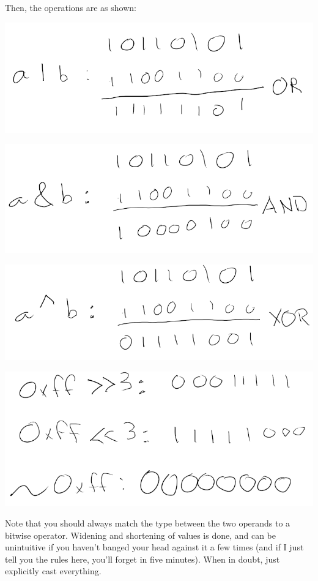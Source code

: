 \documentclass[11pt]{article}
\begin{document}
Then, the operations are as shown:

\begin{center}
\includegraphics[width=.9\linewidth]{./imgs/abor.png}
\end{center}
\begin{center}
\includegraphics[width=.9\linewidth]{./imgs/aband.png}
\end{center}
\begin{center}
\includegraphics[width=.9\linewidth]{./imgs/abxor.png}
\end{center}
\begin{center}
\includegraphics[width=.9\linewidth]{./imgs/lrnot.png}
\end{center}

Note that you should always match the type between the two
operands to a bitwise operator. Widening and shortening of values
is done, and can be unintuitive if you haven't banged your head
against it a few times (and if I just tell you the rules here,
you'll forget in five minutes). When in doubt, just explicitly
cast everything.
\end{document}
